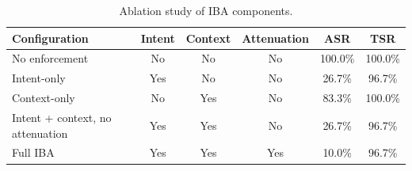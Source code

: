 \begin{table}[t]
\centering
\caption{Ablation study of IBA components.}
\label{tab:ablation-results}
\begin{tabular}{lccccc}
\hline
\textbf{Configuration} & \textbf{Intent} & \textbf{Context} & \textbf{Attenuation} & \textbf{ASR} & \textbf{TSR} \\
\hline
No enforcement & No & No & No & 100.0\% & 100.0\% \\
Intent-only & Yes & No & No & 26.7\% & 96.7\% \\
Context-only & No & Yes & No & 83.3\% & 100.0\% \\
Intent + context, no attenuation & Yes & Yes & No & 26.7\% & 96.7\% \\
Full IBA & Yes & Yes & Yes & 10.0\% & 96.7\% \\
\hline
\end{tabular}
\end{table}
